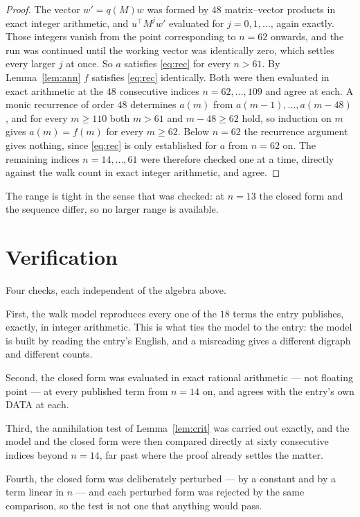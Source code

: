 \documentclass[11pt,a4paper]{article}
\theoremstyle{plain}
\theoremstyle{definition}
\begin{document}
\begin{proof}
The vector $w'=q(M)w$ was formed by $48$ matrix--vector products in exact integer
arithmetic, and $u^{\!\top}M^{j}w'$ evaluated for $j=0,1,\dots$, again exactly. Those integers
vanish from the point corresponding to $n=62$ onwards, and the run was continued until the
working vector was identically zero, which settles every larger $j$ at once. So $a$ satisfies
\eqref{eq:rec} for every $n>61$. By Lemma~\ref{lem:ann} $f$ satisfies \eqref{eq:rec}
identically. Both were then evaluated in exact arithmetic at the $48$ consecutive indices
$n=62,\dots,109$ and agree at each. A monic recurrence of order $48$
determines $a(m)$ from $a(m-1),\dots,a(m-48)$, and for every $m\ge110$ both
$m>61$ and $m-48\ge62$ hold, so induction on $m$ gives $a(m)=f(m)$ for every
$m\ge62$.
Below $n=62$ the recurrence argument gives nothing, since \eqref{eq:rec} is only
established for $a$ from $n=62$ on. The remaining indices $n=14,\dots,61$ were
therefore checked one at a time, directly against the walk count in exact integer arithmetic,
and agree.
\end{proof}

The range is tight in the sense that was checked: at $n=13$ the closed form and the sequence differ, so no larger range is available.

\section{Verification}

Four checks, each independent of the algebra above.

First, the walk model reproduces every one of the $18$ terms the entry publishes,
exactly, in integer arithmetic. This is what ties the model to the entry: the model is built
by reading the entry's English, and a misreading gives a different digraph and different
counts.

Second, the closed form was evaluated in exact rational arithmetic --- not floating point ---
at every published term from $n=14$ on, and agrees with the entry's own DATA at each.

Third, the annihilation test of Lemma~\ref{lem:crit} was carried out exactly, and the model
and the closed form were then compared directly at sixty consecutive indices beyond
$n=14$, far past where the proof already settles the matter.

Fourth, the closed form was deliberately perturbed --- by a constant and by a term linear in
$n$ --- and each perturbed form was rejected by the same comparison, so the test is not one
that anything would pass.
\end{document}
